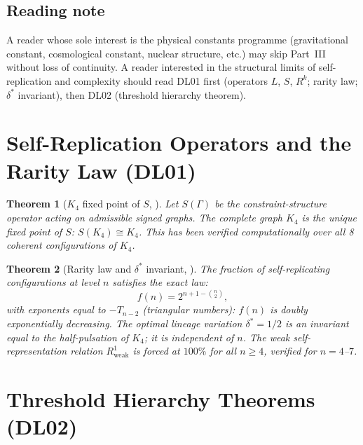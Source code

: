 \documentclass[11pt,a4paper]{article}
\theoremstyle{plain}
\newtheorem{theorem}{Theorem}[section]
\theoremstyle{definition}
\theoremstyle{remark}
\begin{document}
\subsection{Reading note}

A reader whose sole interest is the physical constants programme (gravitational constant, cosmological constant, nuclear structure, etc.) may skip Part~III without loss of continuity. A reader interested in the structural limits of self-replication and complexity should read DL01 first (operators $L$, $S$, $R^k$; rarity law; $\delta^*$ invariant), then DL02 (threshold hierarchy theorem).

\section{Self-Replication Operators and the Rarity Law (DL01)}
\label{sec:DL01}

\begin{theorem}[$K_4$ fixed point of $S$, \cite{DL01}]
\label{thm:DL01_fixedpoint}
Let $S(\Gamma)$ be the constraint-structure operator acting on admissible signed graphs. The complete graph $K_4$ is the unique fixed point of $S$: $S(K_4) \cong K_4$. This has been verified computationally over all 8 coherent configurations of $K_4$.
\end{theorem}

\begin{theorem}[Rarity law and $\delta^*$ invariant, \cite{DL01}]
\label{thm:DL01_rarity}
The fraction of self-replicating configurations at level $n$ satisfies the exact law:
\begin{equation}
f(n) = 2^{n+1-\binom{n}{2}},
\end{equation}
with exponents equal to $-T_{n-2}$ (triangular numbers): $f(n)$ is doubly exponentially decreasing. The optimal lineage variation $\delta^* = 1/2$ is an invariant equal to the half-pulsation of $K_4$; it is independent of $n$. The weak self-representation relation $R^1_{\mathrm{weak}}$ is forced at $100\%$ for all $n \geq 4$, verified for $n = 4$--$7$.
\end{theorem}

\section{Threshold Hierarchy Theorems (DL02)}
\label{sec:DL02}
\end{document}
